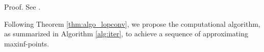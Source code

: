 \documentclass[review]{elsarticle}
\begin{document}
\state Proof. See \citep{Guo_et_al_16}. \eop





Following Theorem \ref{thm:algo_lopconv}, we propose the computational algorithm, as summarized in Algorithm \ref{alg:iter}, to achieve a sequence of approximating maxinf-points.
\end{document}

